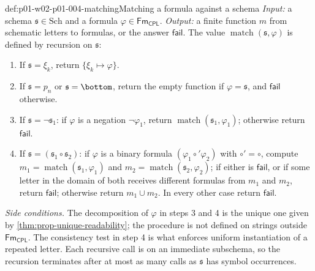 \begin{hbmethod}{def:p01-w02-p01-004-matching}{Matching a formula against a schema}
\emph{Input:} a schema \(\mathfrak s\in\mathrm{Sch}\) and a formula
\(\varphi\in\mathsf{Fm}_{\mathsf{CPL}}\). \emph{Output:} a finite function
\(m\) from schematic letters to formulas, or the answer \(\mathsf{fail}\).
The value \(\operatorname{match}(\mathfrak s,\varphi)\) is defined by
recursion on \(\mathfrak s\):
\begin{enumerate}
  \item If \(\mathfrak s=\xi_k\), return \(\{\xi_k\mapsto\varphi\}\).
  \item If \(\mathfrak s=p_n\) or \(\mathfrak s=\bottom\), return the empty
        function if \(\varphi=\mathfrak s\), and \(\mathsf{fail}\) otherwise.
  \item If \(\mathfrak s=\neg\mathfrak s_1\): if \(\varphi\) is a negation
        \(\neg\varphi_1\), return \(\operatorname{match}(\mathfrak
        s_1,\varphi_1)\); otherwise return \(\mathsf{fail}\).
  \item If \(\mathfrak s=(\mathfrak s_1\circ\mathfrak s_2)\): if \(\varphi\)
        is a binary formula \((\varphi_1\circ'\varphi_2)\) with
        \(\circ'=\circ\), compute \(m_1=\operatorname{match}(\mathfrak
        s_1,\varphi_1)\) and \(m_2=\operatorname{match}(\mathfrak
        s_2,\varphi_2)\); if either is \(\mathsf{fail}\), or if some letter in
        the domain of both receives different formulas from \(m_1\) and
        \(m_2\), return \(\mathsf{fail}\); otherwise return \(m_1\cup m_2\).
        In every other case return \(\mathsf{fail}\).
\end{enumerate}
\emph{Side conditions.} The decomposition of \(\varphi\) in steps 3 and 4 is
the unique one given by \cref{thm:prop-unique-readability}; the procedure is
not defined on strings outside \(\mathsf{Fm}_{\mathsf{CPL}}\). The consistency
test in step 4 is what enforces uniform instantiation of a repeated letter.
Each recursive call is on an immediate subschema, so the recursion
terminates after at most as many calls as \(\mathfrak s\) has symbol
occurrences.
\end{hbmethod}

